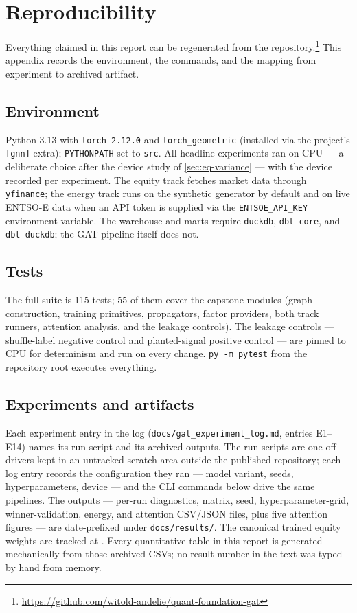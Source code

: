 \chapter{Reproducibility}
\label{app:repro}

Everything claimed in this report can be regenerated from the
repository.\footnote{\url{https://github.com/witold-andelie/quant-foundation-gat}}
This appendix records the environment, the commands, and the
mapping from experiment to archived artifact.

\section*{Environment}

Python 3.13 with \texttt{torch 2.12.0} and \texttt{torch\_geometric}
(installed via the project's \texttt{[gnn]} extra); \texttt{PYTHONPATH}
set to \texttt{src}. All headline experiments ran on CPU --- a
deliberate choice after the device study of \cref{sec:eq-variance} ---
with the device recorded per experiment. The equity track fetches
market data through \texttt{yfinance}; the energy track runs on the
synthetic generator by default and on live ENTSO-E data when an API
token is supplied via the \texttt{ENTSOE\_API\_KEY} environment
variable. The warehouse and marts require \texttt{duckdb},
\texttt{dbt-core}, and \texttt{dbt-duckdb}; the GAT pipeline itself does
not.

\section*{Tests}

The full suite is 115 tests; 55 of them cover the capstone modules
(graph construction, training primitives, propagators, factor
providers, both track runners, attention analysis, and the leakage
controls). The leakage controls --- shuffle-label negative control and
planted-signal positive control --- are pinned to CPU for determinism
and run on every change. \texttt{py -m pytest} from the repository root
executes everything.

\section*{Experiments and artifacts}

Each experiment entry in the log (\texttt{docs/gat\_experiment\_log.md},
entries E1--E14) names its run script and its archived outputs. The run
scripts are one-off drivers kept in an untracked scratch area outside
the published repository; each log entry records the configuration they
ran --- model variant, seeds, hyperparameters, device --- and the CLI
commands below drive the same pipelines. The outputs --- per-run
diagnostics, matrix, seed, hyperparameter-grid, winner-validation,
energy, and attention CSV/JSON files, plus five attention figures ---
are date-prefixed under \texttt{docs/results/}. The canonical trained
equity weights are tracked at
. Every quantitative table in
this report is generated mechanically from those archived CSVs; no
result number in the text was typed by hand from memory.

